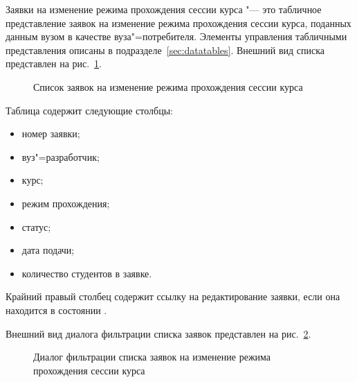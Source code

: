 Заявки на изменение режима прохождения сессии курса "--- это табличное представление заявок на изменение 
режима прохождения сессии курса, поданных данным вузом в качестве вуза"=потребителя. 
Элементы управления табличными представления описаны в подразделе~\ref{sec:datatables}.
Внешний вид списка представлен на рис.~\ref{img:student:change_mode_req_list}. 

\begin{figure}[H]
	\caption{Список заявок на изменение режима прохождения сессии курса}
	\label{img:student:change_mode_req_list}
\end{figure}

Таблица содержит следующие столбцы:
\begin{itemize}
	\item номер заявки;
	\item вуз"=разработчик;
	\item курс;
	\item режим прохождения;
	\item статус;
	\item дата подачи;
	\item количество студентов в заявке.
\end{itemize}
Крайний правый столбец содержит ссылку на редактирование заявки, если она находится в состоянии .


Внешний вид диалога фильтрации списка заявок представлен на рис.~\ref{img:student:change_mode_req_list_filter}.
\begin{figure}[H]
	\caption{Диалог фильтрации списка заявок на изменение режима прохождения сессии курса}
	\label{img:student:change_mode_req_list_filter}
\end{figure}

